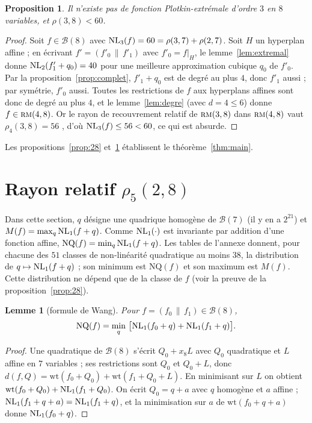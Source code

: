 \documentclass[11pt,a4paper]{article}
\newcommand{\NQ}{\mathrm{NQ}}
\newcommand{\wt}{\mathrm{wt}}
\newcommand{\dist}{d}
\def\NL(#1,#2){ {\rm NL}_{#1}(#2) }
\def\rmc(#1,#2){ \textsc {rm}(#1,#2) }
\def\boole(#1){\mathcal{B}(#1)}
\theoremstyle{plain}
\newtheorem{proposition}[theorem]{Proposition}
\newtheorem{lemma}[theorem]{Lemme}
\theoremstyle{definition}
\theoremstyle{remark}
\begin{document}
\begin{proposition}\label{prop:38}
Il n'existe pas de fonction Plotkin-extrémale d'ordre $3$ en $8$ variables, et
$\rho(3,8)<60$.
\end{proposition}
\begin{proof}
Soit $f\in\boole(8)$ avec $\NL(3,f)=60=\rho(3,7)+\rho(2,7)$. Soit $H$ un
hyperplan affine ; en écrivant $f'=(f'_0\,\|\,f'_1)$ avec $f'_0=f|_H$, le
lemme~\ref{lem:extremal} donne $\NL(2,f'_1+q_0)=40$ pour une meilleure
approximation cubique $q_0$ de $f'_0$. Par la proposition~\ref{prop:complet},
$f'_1+q_0$ est de degré au plus $4$, donc $f'_1$ aussi ; par symétrie, $f'_0$
aussi. Toutes les restrictions de $f$ aux hyperplans affines sont donc de degré
au plus $4$, et le lemme~\ref{lem:degre} (avec $d=4\le 6$) donne
$f\in\rmc(4,8)$. Or le rayon de recouvrement relatif de $\rmc(3,8)$ dans
$\rmc(4,8)$ vaut $\rho_4(3,8)=56$ \cite{Gao26}, %
d'où $\NL(3,f)\le 56<60$, ce qui est absurde.
\end{proof}

Les propositions~\ref{prop:28} et~\ref{prop:38} établissent le
théorème~\ref{thm:main}.
\section{Rayon relatif $\rho_5(2,8)$}\label{sec:relatif}

Dans cette section, $q$ désigne une quadrique homogène de $\boole(7)$ (il y en a
$2^{21}$) et $M(f)=\max_q \NL(1,f+q)$. Comme $\NL(1,\cdot)$ est invariante par
addition d'une fonction affine, $\NQ(f)=\min_q\NL(1,f+q)$. Les tables de
l'annexe donnent, pour chacune des $51$ classes de non-linéarité quadratique au
moins $38$, la distribution de $q\mapsto\NL(1,f+q)$ ; son minimum est $\NQ(f)$ et
son maximum est $M(f)$. Cette distribution ne dépend que de la classe de $f$ (voir
la preuve de la proposition~\ref{prop:28}).

\begin{lemma}[formule de Wang]\label{lem:wang}
Pour $f=(f_0\,\|\,f_1)\in\boole(8)$,
$$
\NQ(f)=\min_{q}\ \bigl[\NL(1,f_0+q)+\NL(1,f_1+q)\bigr].
$$
\end{lemma}
\begin{proof}
Une quadratique de $\boole(8)$ s'écrit $Q_0+x_8L$ avec $Q_0$ quadratique et $L$
affine en $7$ variables ; ses restrictions sont $Q_0$ et $Q_0+L$, donc
$\dist(f,Q)=\wt(f_0+Q_0)+\wt(f_1+Q_0+L)$. En minimisant sur $L$ on obtient
$\wt(f_0+Q_0)+\NL(1,f_1+Q_0)$. On écrit $Q_0=q+a$ avec $q$ homogène et $a$
affine ; $\NL(1,f_1+q+a)=\NL(1,f_1+q)$, et la minimisation sur $a$ de
$\wt(f_0+q+a)$ donne $\NL(1,f_0+q)$.
\end{proof}
\end{document}
